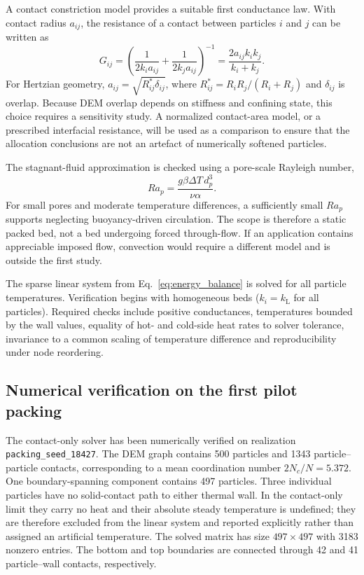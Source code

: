 \documentclass[12pt,a4paper]{article}
\begin{document}
A contact constriction model provides a suitable first conductance law. With
contact radius $a_{ij}$, the resistance of a contact between particles $i$ and
$j$ can be written as
\begin{equation}
    G_{ij}=
    \left(\frac{1}{2k_i a_{ij}}+
    \frac{1}{2k_j a_{ij}}\right)^{-1}
    =\frac{2a_{ij}k_i k_j}{k_i+k_j}.
    \label{eq:conductance}
\end{equation}
For Hertzian geometry, $a_{ij}=\sqrt{R_{ij}^{*}\delta_{ij}}$, where
$R_{ij}^{*}=R_iR_j/(R_i+R_j)$ and $\delta_{ij}$ is overlap. Because DEM overlap
depends on stiffness and confining state, this choice requires a sensitivity
study. A normalized contact-area model, or a prescribed interfacial resistance,
will be used as a comparison to ensure that the allocation conclusions are not
an artefact of numerically softened particles.

The stagnant-fluid approximation is checked using a pore-scale Rayleigh number,
\begin{equation}
    Ra_p=\frac{g\beta\Delta T\,d_p^3}{\nu\alpha}.
\end{equation}
For small pores and moderate temperature differences, a sufficiently small
$Ra_p$ supports neglecting buoyancy-driven circulation. The scope is therefore
a static packed bed, not a bed undergoing forced through-flow. If an application
contains appreciable imposed flow, convection would require a different model
and is outside the first study.

The sparse linear system from Eq.~\eqref{eq:energy_balance} is solved for all
particle temperatures. Verification begins with homogeneous beds
($k_i=k_{\mathrm L}$ for all particles). Required checks include positive
conductances, temperatures bounded by the wall values, equality of hot- and
cold-side heat rates to solver tolerance, invariance to a common scaling of
temperature difference and reproducibility under node reordering.

\subsection*{Numerical verification on the first pilot packing}

The contact-only solver has been numerically verified on realization
\texttt{packing\_seed\_18427}. The DEM graph contains 500 particles and 1343
particle--particle contacts, corresponding to a mean coordination number
$2N_c/N=5.372$. One boundary-spanning component contains 497 particles. Three
individual particles have no solid-contact path to either thermal wall. In the
contact-only limit they carry no heat and their absolute steady temperature is
undefined; they are therefore excluded from the linear system and reported
explicitly rather than assigned an artificial temperature. The solved matrix
has size $497\times497$ with 3183 nonzero entries. The bottom and top boundaries
are connected through 42 and 41 particle--wall contacts, respectively.
\end{document}
